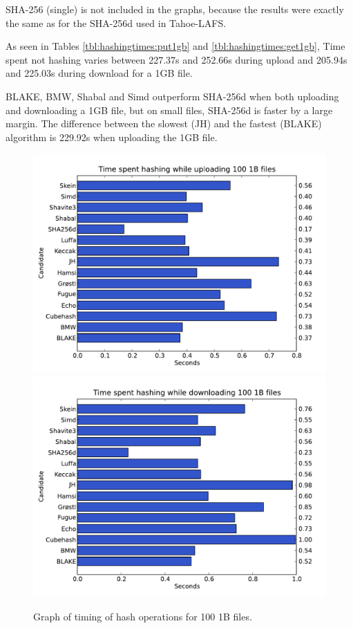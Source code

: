 \documentclass[english,12pt,a4paper]{book}
\begin{document}
\ac{SHA}-256 (single) is not included in the graphs, because the results were
exactly the same as for the \ac{SHA}-256d used in Tahoe-\ac{LAFS}.

As seen in Tables \ref{tbl:hashingtimes:put1gb} and
\ref{tbl:hashingtimes:get1gb}, Time spent not hashing varies between 227.37s and
252.66s during upload and 205.94s and 225.03s during download for a 1GB file.

BLAKE, \ac{BMW}, Shabal and Simd outperform \ac{SHA}-256d when both uploading
and downloading a 1GB file, but on small files, \ac{SHA}-256d is faster by a
large margin. The difference between the slowest (JH) and the fastest (BLAKE)
algorithm is 229.92s when uploading the 1GB file.







\begin{figure}[h!]
    \centering
    \includegraphics[width=0.9\columnwidth]
        {graphs/Timespenthashingwhileuploading1001Bfiles.pdf}
    \includegraphics[width=0.9\columnwidth]
        {graphs/Timespenthashingwhiledownloading1001Bfiles.pdf}
    \caption{Graph of timing of hash operations for 100 1B files.}
    \label{fig:graph:1001b}
\end{figure}
\end{document}
